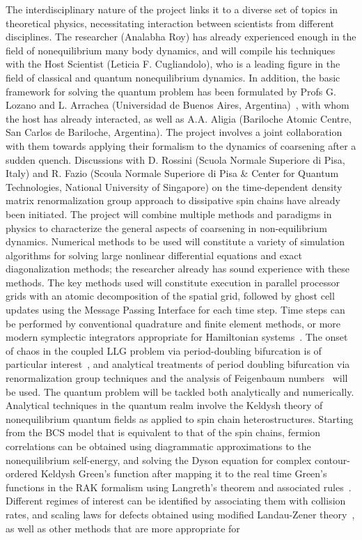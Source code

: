 \documentclass[a4paper,11pt,color]{article}
\begin{document}
The interdisciplinary nature of the project links it to  a diverse set of topics in theoretical physics, necessitating interaction between scientists from different disciplines. The researcher (Analabha Roy) has already experienced enough in the field of nonequilibrium many body dynamics, and will compile his techniques with the Host Scientist (Leticia F. Cugliandolo), who is a leading figure in the field of classical and quantum nonequilibrium dynamics. In addition, the basic framework for solving the quantum problem has been formulated by Profs G. Lozano and L. Arrachea (Universidad de Buenos Aires, Argentina)~\cite{arrachea, arrachea2}, with whom the host has already interacted, as well as A.A. Aligia (Bariloche Atomic Centre, San Carlos de Bariloche, Argentina). The project involves a joint collaboration with them towards applying their formalism to the dynamics of coarsening after a sudden quench.  {Discussions with D. Rossini (Scuola Normale Superiore di Pisa, Italy) 
and R. Fazio (Scoula Normale Superiore di Pisa \& Center for Quantum Technologies, National University of Singapore) on the time-dependent density matrix renormalization group approach to dissipative spin chains have already been initiated.}
The project will combine  multiple methods and paradigms in physics to characterize the general aspects of coarsening in non-equilibrium dynamics. Numerical methods to be used will constitute a variety of simulation algorithms for solving  large nonlinear differential equations and exact diagonalization methods; the researcher already has sound experience with these methods. The key methods used will constitute execution in parallel processor grids with an atomic decomposition of the spatial grid, followed by ghost cell updates using the Message Passing Interface for each time step. Time steps can be performed by conventional quadrature and finite element methods, or more modern symplectic integrators appropriate for Hamiltonian systems~\cite{symplectic}.   {The onset of chaos in the coupled LLG problem via period-doubling bifurcation is of particular interest}~\cite{gll:review}, and analytical treatments of period doubling bifurcation via renormalization group techniques and the analysis 
of Feigenbaum numbers~\cite{hilborn} will be used. The quantum problem will be tackled both analytically and numerically. Analytical techniques in the quantum realm involve the Keldysh theory of nonequilibrium quantum fields as applied to spin chain heterostructures. Starting from the BCS model that is equivalent to that of the spin chains, fermion correlations can be obtained using diagrammatic approximations to the nonequilibrium self-energy, and solving the Dyson equation for complex contour-ordered Keldysh Green's function after mapping it to the real time Green's functions in the RAK formalism using Langreth's theorem and associated rules~\cite{rammer, arrachea}. Different regimes of interest can be identified by associating them with collision rates, and scaling laws for defects obtained  using modified Landau-Zener theory~\cite{fermidyn}, as well as other methods that are more appropriate for 
\end{document}

